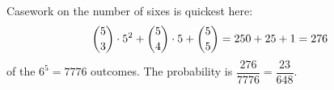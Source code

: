 Casework on the number of sixes is quickest here:
\[\dbinom53\cdot5^2+\dbinom54\cdot5+\dbinom55=250+25+1=276\]
of the $6^5=7776$ outcomes. The probability is $\dfrac{276}{7776}=\boxed{\dfrac{23}{648}}$.
